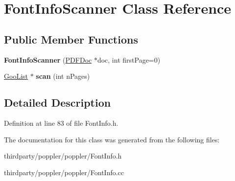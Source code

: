 \hypertarget{class_font_info_scanner}{}\section{Font\+Info\+Scanner Class Reference}
\label{class_font_info_scanner}
\subsection*{Public Member Functions}
\begin{DoxyCompactItemize}
\item 
\mbox{\label{class_font_info_scanner_a384c578bd6d49ac13dd20b9c0eb44352}} 
{\bfseries Font\+Info\+Scanner} (\hyperlink{class_p_d_f_doc}{P\+D\+F\+Doc} $\ast$doc, int first\+Page=0)
\item 
\mbox{\label{class_font_info_scanner_a7018d863f749c785ba545101013a1988}} 
\hyperlink{class_goo_list}{Goo\+List} $\ast$ {\bfseries scan} (int n\+Pages)
\end{DoxyCompactItemize}


\subsection{Detailed Description}


Definition at line 83 of file Font\+Info.\+h.



The documentation for this class was generated from the following files\+:\begin{DoxyCompactItemize}
\item 
thirdparty/poppler/poppler/Font\+Info.\+h\item 
thirdparty/poppler/poppler/Font\+Info.\+cc\end{DoxyCompactItemize}
